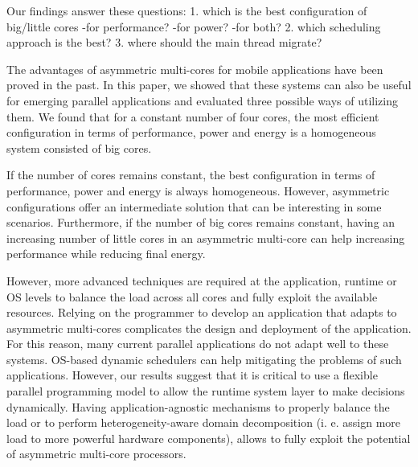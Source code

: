 % 

\iffalse


Our findings answer these questions:
1. which is the best configuration of big/little cores
-for performance?
-for power?
-for both?
2. which scheduling approach is the best?
3. where should the main thread migrate?



The advantages of asymmetric multi-cores for mobile applications have been proved in the past. 
In this paper, we showed that these systems can also be useful for emerging parallel applications and evaluated three possible ways of utilizing them. 
We found that for a constant number of four cores, the most efficient configuration in terms of performance, power and energy is a homogeneous system consisted of big cores.

If the number of cores remains constant, the best configuration in terms of performance, power and energy is always homogeneous. 
However, asymmetric configurations offer an intermediate solution that can be interesting in some scenarios. Furthermore, if the number of big cores remains constant, having an increasing number of little cores in an asymmetric multi-core can help increasing performance while reducing final energy. 

However, more advanced techniques are required at the application, runtime or OS levels to balance the load across all cores and fully exploit the available resources. Relying on the programmer to develop an application that adapts to asymmetric multi-cores complicates the design and deployment of the application. For this reason, many current parallel applications do not adapt well to these systems. OS-based dynamic schedulers can help mitigating the problems of such applications. However, our results suggest that it is critical to use a flexible parallel programming model to allow the runtime system layer to make decisions dynamically. Having application-agnostic mechanisms to properly balance the load or to perform heterogeneity-aware domain decomposition (i. e. assign more load to more powerful hardware components), allows to fully exploit the potential of asymmetric multi-core processors.

